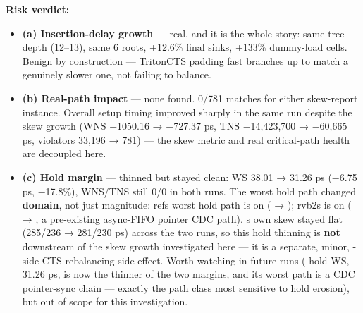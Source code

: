 \begin{record}
\textbf{Risk verdict:}

\begin{itemize}
\tightlist
\item
  \textbf{(a) Insertion-delay growth} --- real, and it is the whole
  story: same tree depth (12--13), same 6 roots, +12.6\% final sinks,
  +133\% dummy-load cells. Benign by construction --- TritonCTS padding
  fast branches up to match a genuinely slower one, not failing to
  balance.
\item
  \textbf{(b) Real-path impact} --- none found. 0/781
   matches for either skew-report instance.
  Overall setup timing improved sharply in the same run despite the skew
  growth (WNS −1050.16 → −727.37 ps, TNS −14,423,700 → −60,665 ps,
  violators 33,196 → 781) --- the skew metric and real critical-path
  health are decoupled here.
\item
  \textbf{(c) Hold margin} --- thinned but stayed clean: WS 38.01 →
  31.26 ps (−6.75 ps, −17.8\%), WNS/TNS still 0/0 in both runs. The
  worst hold path changed \textbf{domain}, not just magnitude:
  ref\textquotesingle s worst hold path is on 
  ( → );
  rvb2\textquotesingle s is on 
  ( → , a
  pre-existing async-FIFO pointer CDC path).
  \textquotesingle s own skew stayed flat (285/236 →
  281/230 ps) across the two runs, so this hold thinning is \textbf{not}
  downstream of the  skew growth investigated here --- it
  is a separate, minor, -side CTS-rebalancing side effect.
  Worth watching in future runs ( hold WS, 31.26 ps, is
  now the thinner of the two margins, and its worst path is a CDC
  pointer-sync chain --- exactly the path class most sensitive to hold
  erosion), but out of scope for this investigation.
\end{itemize}


\end{record}
